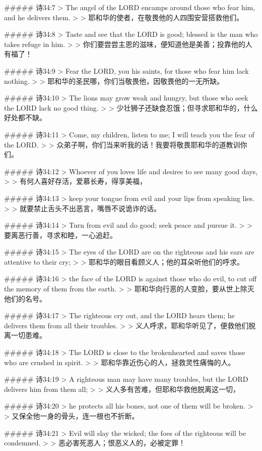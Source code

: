 ##### 诗34:7
> The angel of the LORD encamps around those who fear him, and he delivers them.
>
> 耶和华的使者，在敬畏他的人四围安营搭救他们。


##### 诗34:8
> Taste and see that the LORD is good; blessed is the man who takes refuge in him.
>
> 你们要尝尝主恩的滋味，便知道他是美善；投靠他的人有福了！


##### 诗34:9
> Fear the LORD, you his saints, for those who fear him lack nothing.
>
> 耶和华的圣民哪，你们当敬畏他，因敬畏他的一无所缺。


##### 诗34:10
> The lions may grow weak and hungry, but those who seek the LORD lack no good thing.
>
> 少壮狮子还缺食忍饿；但寻求耶和华的，什么好处都不缺。


##### 诗34:11
> Come, my children, listen to me; I will teach you the fear of the LORD.
>
> 众弟子啊，你们当来听我的话！我要将敬畏耶和华的道教训你们。


##### 诗34:12
> Whoever of you loves life and desires to see many good days,
>
> 有何人喜好存活，爱慕长寿，得享美福，


##### 诗34:13
> keep your tongue from evil and your lips from speaking lies.
>
> 就要禁止舌头不出恶言，嘴唇不说诡诈的话。


##### 诗34:14
> Turn from evil and do good; seek peace and pursue it.
>
> 要离恶行善，寻求和睦，一心追赶。


##### 诗34:15
> The eyes of the LORD are on the righteous and his ears are attentive to their cry;
>
> 耶和华的眼目看顾义人；他的耳朵听他们的呼求。


##### 诗34:16
> the face of the LORD is against those who do evil, to cut off the memory of them from the earth.
>
> 耶和华向行恶的人变脸，要从世上除灭他们的名号。


##### 诗34:17
> The righteous cry out, and the LORD hears them; he delivers them from all their troubles.
>
> 义人呼求，耶和华听见了，便救他们脱离一切患难。


##### 诗34:18
> The LORD is close to the brokenhearted and saves those who are crushed in spirit.
>
> 耶和华靠近伤心的人，拯救灵性痛悔的人。


##### 诗34:19
> A righteous man may have many troubles, but the LORD delivers him from them all;
>
> 义人多有苦难，但耶和华救他脱离这一切，


##### 诗34:20
> he protects all his bones, not one of them will be broken.
>
> 又保全他一身的骨头，连一根也不折断。


##### 诗34:21
> Evil will slay the wicked; the foes of the righteous will be condemned.
>
> 恶必害死恶人；恨恶义人的，必被定罪！


